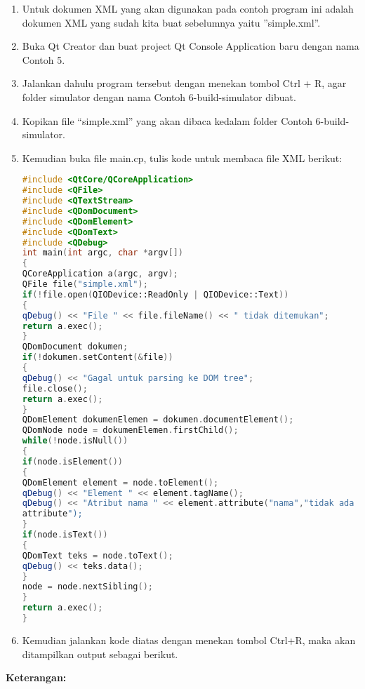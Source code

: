 \begin{enumerate}
\def\labelenumi{\arabic{enumi}.}
\item
  Untuk dokumen XML yang akan digunakan pada contoh program ini adalah
  dokumen XML yang sudah kita buat sebelumnya yaitu ''simple.xml''.
\item
  Buka Qt Creator dan buat project Qt Console Application baru dengan
  nama Contoh 5.
\item
  Jalankan dahulu program tersebut dengan menekan tombol Ctrl + R, agar
  folder simulator dengan nama Contoh 6-build-simulator dibuat.
\item
  Kopikan file ``simple.xml'' yang akan dibaca kedalam folder Contoh
  6-build-simulator.
\item
  Kemudian buka file main.cp, tulis kode untuk membaca file XML berikut:

\begin{lstlisting}[language=c++]
#include <QtCore/QCoreApplication>
#include <QFile>
#include <QTextStream>
#include <QDomDocument>
#include <QDomElement>
#include <QDomText>
#include <QDebug>
int main(int argc, char *argv[])
{
QCoreApplication a(argc, argv);
QFile file("simple.xml");
if(!file.open(QIODevice::ReadOnly | QIODevice::Text))
{
qDebug() << "File " << file.fileName() << " tidak ditemukan";
return a.exec();
}
QDomDocument dokumen;
if(!dokumen.setContent(&file))
{
qDebug() << "Gagal untuk parsing ke DOM tree";
file.close();
return a.exec();
}
QDomElement dokumenElemen = dokumen.documentElement();
QDomNode node = dokumenElemen.firstChild();
while(!node.isNull())
{
if(node.isElement())
{
QDomElement element = node.toElement();
qDebug() << "Element " << element.tagName();
qDebug() << "Atribut nama " << element.attribute("nama","tidak ada
attribute");
}
if(node.isText())
{
QDomText teks = node.toText();
qDebug() << teks.data();
}
node = node.nextSibling();
}
return a.exec();
}
\end{lstlisting}
\item
  Kemudian jalankan kode diatas dengan menekan tombol Ctrl+R, maka akan
  ditampilkan output sebagai berikut.
\end{enumerate}

\textbf{Keterangan:}

